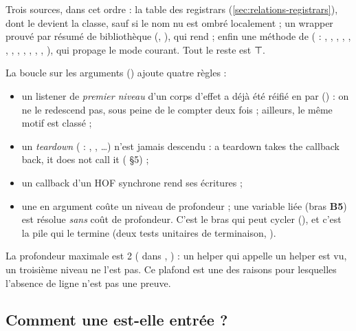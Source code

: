 
Trois sources, dans cet ordre : la table des registrars (\cref{sec:relations-registrars}), dont le  devient la classe, sauf si le nom nu est ombré localement ; un wrapper prouvé par résumé de bibliothèque (, ), qui rend  ; enfin une méthode de  ( : , , , , , , , , , , , , ), qui propage le mode courant. Tout le reste est ⊤.

La boucle sur les arguments () ajoute quatre règles :
\begin{itemize}
  \item un listener  de \emph{premier niveau} d'un corps d'effet a déjà été réifié en  par  () : on ne le redescend pas, sous peine de le compter deux fois ; ailleurs, le même motif est classé  ;
  \item un \emph{teardown} ( : , , \dots) n'est jamais descendu : \og a teardown takes the callback back, it does not call it\fg{} ( §5) ;
  \item un callback d'un HOF synchrone rend ses écritures  ;
  \item une  en argument coûte un niveau de profondeur ; une variable liée (bras \textbf{B5}) est résolue \emph{sans} coût de profondeur. C'est le bras qui peut cycler (), et c'est la pile  qui le termine (deux tests unitaires de terminaison, ).
\end{itemize}

La profondeur maximale est 2 ( dans , ) : un helper qui appelle un helper est vu, un troisième niveau ne l'est pas. Ce plafond est une des raisons pour lesquelles l'absence de ligne n'est pas une preuve.

\subsection{Comment une  est-elle entrée ?}

